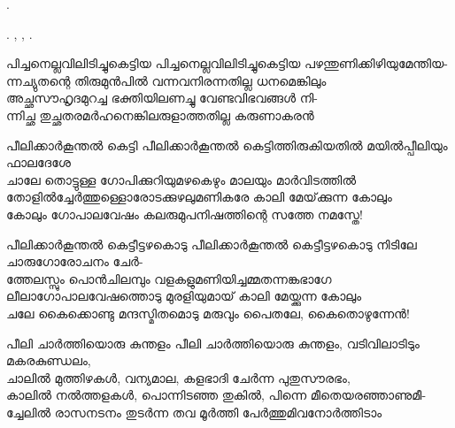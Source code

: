 \begin{enumerate}

.

. , 
, .

\begin{slokam}{\VKm}{\VKG}{പിച്ചനെല്ലവിലിടിച്ചുകെട്ടിയ}
പിച്ചനെല്ലവിലിടിച്ചുകെട്ടിയ പഴന്തുണിക്കിഴിയുമേന്തിയ-\\
ന്നച്യുതന്റെ തിരുമുൻപിൽ വന്നവനിരന്നതില്ല ധനമെങ്കിലും\\
അച്ഛസൗഹൃദമുറച്ച ഭക്തിയിലണച്ചു വേണ്ടവിഭവങ്ങള്‍ നി-\\
ന്നിച്ഛ തുച്ഛതരമർഹനെങ്കിലരുളാത്തതില്ല കരുണാകരൻ
\end{slokam}


\begin{slokam}{\VSr}{\GRT}{പീലിക്കാർകൂന്തൽ കെട്ടി}
 പീലിക്കാർകൂന്തൽ കെട്ടിത്തിരുകിയതിൽ മയിൽപ്പീലിയും ഫാലദേശേ\\
ചാലേ തൊട്ടുള്ള ഗോപിക്കുറിയുമഴകെഴും മാലയും മാർവിടത്തിൽ\\
തോളിൽച്ചേർത്തുള്ളൊരോടക്കുഴലുമണികരേ കാലി മേയ്‌ക്കുന്ന കോലും\\
കോലും ഗോപാലവേഷം കലരുമുപനിഷത്തിന്റെ സത്തേ നമസ്തേ!
\end{slokam}


\begin{slokam}{\VSr}{\Poonth}{പീലിക്കാർകൂന്തൽ കെട്ടീട്ടഴകൊടു}
പീലിക്കാർകൂന്തൽ കെട്ടീട്ടഴകൊടു നിടിലേ ചാരുഗോരോചനം ചേർ-\\
ത്തേലസ്സും പൊൻചിലമ്പും വളകളുമണിയിച്ചമ്മതന്നങ്കഭാഗേ\\
ലീലാഗോപാലവേഷത്തൊടു മുരളിയുമായ്‌ കാലി മേയ്ക്കുന്ന കോലും\\
ചലേ കൈക്കൊണ്ടു മന്ദസ്മിതമൊടു മരുവും പൈതലേ, കൈതൊഴുന്നേൻ!
\end{slokam}




\begin{slokam}{\VKm}{\CVVB}{പീലി ചാർത്തിയൊരു കുന്തളം}
പീലി ചാർത്തിയൊരു കുന്തളം, വടിവിലാടിടും മകരകുണ്ഡലം,\\
ചാലിൽ മുത്തിഴകള്‍, വന്യമാല, കളഭാദി ചേർന്ന പുതുസൗരഭം,\\
കാലിൽ നൽത്തളകള്‍, പൊന്നിടഞ്ഞ തുകിൽ, പിന്നെ മീതെയരഞ്ഞാണുമീ-\\
ച്ചേലിൽ രാസനടനം തുടർന്ന തവ മൂർത്തി പേർത്തുമിവനോർത്തിടാം
\end{slokam}


\end{enumerate}
